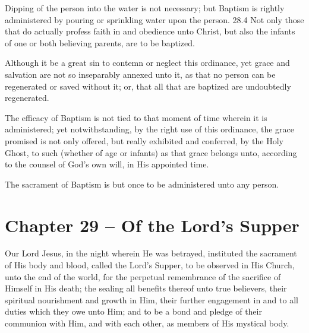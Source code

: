 \begin{outerlst}[left=0pt,labelsep=0pt]
\begin{innerlst}[resume*]
\item Dipping of the person into the water is not necessary; but Baptism is rightly administered by pouring or sprinkling water upon the person.  28.4 Not only those that do actually profess faith in and obedience unto Christ, but also the infants of one or both believing parents, are to be baptized.   

\item Although it be a great sin to contemn or neglect this ordinance, yet grace and salvation are not so inseparably annexed unto it, as that no person can be regenerated or saved without it; or, that all that are baptized are undoubtedly regenerated.   

\item The efficacy of Baptism is not tied to that moment of time wherein it is administered; yet notwithstanding, by the right use of this ordinance, the grace promised is not only offered, but really exhibited and conferred, by the Holy Ghost, to such (whether of age or infants) as that grace belongs unto, according to the counsel of God's own will, in His appointed time.   

\item The sacrament of Baptism is but once to be administered unto any person.  
\end{innerlst}

\item
{}
\section{Chapter 29 -- Of the Lord's Supper}
\begin{innerlst}[resume*]

\item Our Lord Jesus, in the night wherein He was betrayed, instituted the sacrament of His body and blood, called the Lord's Supper, to be observed in His Church, unto the end of the world, for the perpetual remembrance of the sacrifice of Himself in His death; the sealing all benefits thereof unto true believers, their spiritual nourishment and growth in Him, their further engagement in and to all duties which they owe unto Him; and to be a bond and pledge of their communion with Him, and with each other, as members of His mystical body.   


\end{innerlst}
\end{outerlst}
